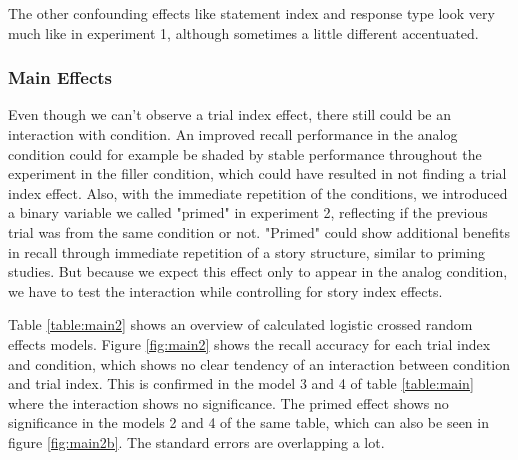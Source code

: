 \documentclass[a4paper,man,natbib,floatsintext,import]{apa6}
\begin{document}
The other confounding effects like statement index and response type look very much like in experiment 1, although sometimes a little different accentuated.

\subsubsection{Main Effects}



Even though we can't observe a trial index effect, there still could be an interaction with condition. An improved recall performance in the analog condition could for example be shaded by stable performance throughout the experiment in the filler condition, which could have resulted in not finding a trial index effect. Also, with the immediate repetition of the conditions, we introduced a binary variable we called "primed" in experiment 2, reflecting if the previous trial was from the same condition or not. "Primed" could show additional benefits in recall through immediate repetition of a story structure, similar to priming studies. But because we expect this effect only to appear in the analog condition, we have to test the interaction while controlling for story index effects.

Table \ref{table:main2} shows an overview of calculated logistic crossed random effects models. Figure \ref{fig:main2} shows the recall accuracy for each trial index and condition, which shows no clear tendency of an interaction between condition and trial index. This is confirmed in the model 3 and 4 of table \ref{table:main} where the interaction shows no significance. The primed effect shows no significance in the models 2 and 4 of the same table, which can also be seen in figure \ref{fig:main2b}. The standard errors are overlapping a lot.
\end{document}
